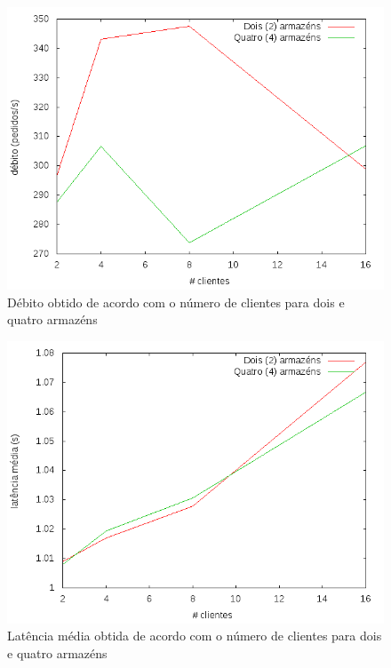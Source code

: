 \begin{figure}[!h]
\centering
\includegraphics[scale=.4]{img/questao-1/read-uncom-deb}
\caption{Débito obtido de acordo com o número de clientes para dois e quatro armazéns}
\end{figure}

\begin{figure}[!h]
\centering
\includegraphics[scale=.4]{img/questao-1/read-uncom-lat-med}
\caption{Latência média obtida de acordo com o número de clientes para dois e quatro armazéns}
\end{figure}


